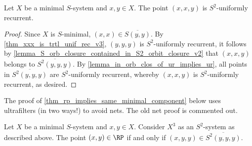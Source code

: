 \begin{theorem}
\label{thm_xxy_is_trtl_unif_rec_v3}
\leanok{}
    Let $X$ be a minimal $S$-system and $x, y \in X$.  The point $(x,x,y)$ is $S^2$-uniformly recurrent.
\end{theorem}

\begin{proof}
\leanok{}
Since $X$ is $S$-minimal, $(x,x) \in \overline{S(y,y)}$. By \cref{thm_xxx_is_trtl_unif_rec_v3}, $(y,y,y)$ is $S^2$-uniformly recurrent, it follows by \cref{lemma_S_orb_closure_contained_in_S2_orbit_closure_v2} that $(x,x,y)$ belongs to $\overline{S^2(y,y,y)}$. By \cref{lemma_in_orb_clos_of_ur_implies_ur}, all points in $\overline{S^2(y,y,y)}$ are $S^2$-uniformly recurrent, whereby $(x,x,y)$ is $S^2$-uniformly recurrent, as desired.
\end{proof}

The proof of \cref{thm_rp_implies_same_minimal_component} below uses ultrafilters (in two ways!) to avoid nets.  The old net proof is commented out.


\begin{theorem}
\label{thm_rp_implies_same_minimal_component}
\label{theorem_cube_space_orbit_implies_rp}
\leanok{}
    Let $X$ be a minimal $S$-system and $x, y \in X$. Consider $X^3$ as an $S^2$-system as described above. The point $(x,y) \in \RP$ if and only if $(x,y,y) \in \overline{S^2(y,y,y)}$.
\end{theorem}

